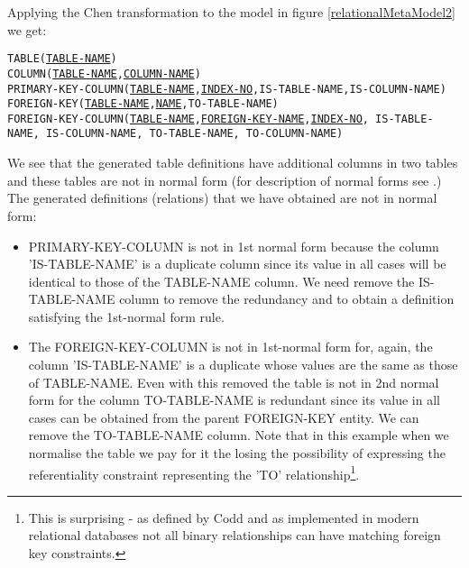 \documentclass[10pt,a4paper]{article}
\begin{document}
\noindent Applying the Chen transformation to the model in figure \ref{relationalMetaModel2} we get:


{\addtolength{\leftskip}{5mm}
\begin{minipage}{\dimexpr\textwidth-1.5cm}
\noindent
\texttt{TABLE(\underline{TABLE-NAME}) \\
COLUMN(\underline{TABLE-NAME},\underline{COLUMN-NAME})       \\
PRIMARY-KEY-COLUMN(\underline{TABLE-NAME},\underline{INDEX-NO},IS-TABLE-NAME,IS-COLUMN-NAME)      \\
FOREIGN-KEY(\underline{TABLE-NAME},\underline{NAME},TO-TABLE-NAME)    \\
FOREIGN-KEY-COLUMN(\underline{TABLE-NAME},\underline{FOREIGN-KEY-NAME},\underline{INDEX-NO},
          IS-TABLE-NAME, IS-COLUMN-NAME, TO-TABLE-NAME, TO-COLUMN-NAME) \\
}
\end{minipage}
}

\noindent We see that the generated table definitions have additional columns in two tables and these tables are not in normal form (for description of normal forms see \cite{Kent1983}.)
The generated definitions (relations) that we have obtained are not in normal form:

\begin{itemize}
\item {PRIMARY-KEY-COLUMN is not in 1st normal form because the column 'IS-TABLE-NAME' is a duplicate column since its value in all cases will
be identical to those of the TABLE-NAME column. We need remove the IS-TABLE-NAME column to remove the redundancy and to obtain a definition satisfying the 1st-normal form rule.}
\item {The FOREIGN-KEY-COLUMN is not in 1st-normal form for, again, the column 'IS-TABLE-NAME' is a duplicate whose values are the same as those of TABLE-NAME. Even with this removed 
the table is not in 2nd normal form for the column TO-TABLE-NAME is redundant since its value in all cases can be obtained from the parent FOREIGN-KEY entity. We can remove the TO-TABLE-NAME column. Note that in this example when we
normalise the table we pay for it the losing the possibility of expressing the referentiality constraint representing the 'TO' relationship\footnote{This is surprising - as defined by Codd and as implemented in modern relational databases not all binary relationships can have
matching foreign key constraints.}.}
\end{itemize}
\end{document}
